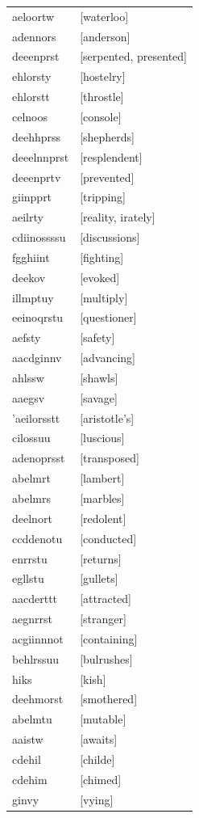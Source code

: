 \documentclass{article}
\begin{document}
\begin{tabular}{ll}
aeloortw & [waterloo] \\
adennors & [anderson] \\
deeenprst & [serpented, presented] \\
ehlorsty & [hostelry] \\
ehlorstt & [throstle] \\
celnoos & [console] \\
deehhprss & [shepherds] \\
deeelnnprst & [resplendent] \\
deeenprtv & [prevented] \\
giinpprt & [tripping] \\
aeilrty & [reality, irately] \\
cdiinossssu & [discussions] \\
fgghiint & [fighting] \\
deekov & [evoked] \\
illmptuy & [multiply] \\
eeinoqrstu & [questioner] \\
aefsty & [safety] \\
aacdginnv & [advancing] \\
ahlssw & [shawls] \\
aaegsv & [savage] \\
'aeilorsstt & [aristotle's] \\
cilossuu & [luscious] \\
adenoprsst & [transposed] \\
abelmrt & [lambert] \\
abelmrs & [marbles] \\
deelnort & [redolent] \\
ccddenotu & [conducted] \\
enrrstu & [returns] \\
egllstu & [gullets] \\
aacderttt & [attracted] \\
aegnrrst & [stranger] \\
acgiinnnot & [containing] \\
behlrssuu & [bulrushes] \\
hiks & [kish] \\
deehmorst & [smothered] \\
abelmtu & [mutable] \\
aaistw & [awaits] \\
cdehil & [childe] \\
cdehim & [chimed] \\
ginvy & [vying] \\

\end{tabular}
\end{document}
